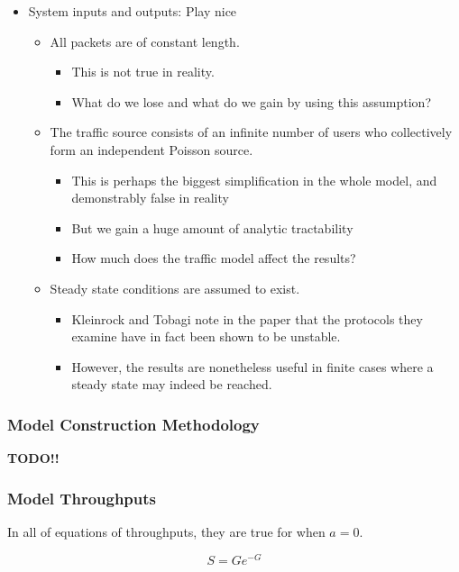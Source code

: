 \begin{itemize}[noitemsep]
\item System inputs and outputs: Play nice
  \begin{itemize}[noitemsep]
  \item All packets are of constant length.
    \begin{itemize}[noitemsep]
    \item This is not true in reality.
    \item What do we lose and what do we gain by using this assumption?
    \end{itemize}
  \item The traffic source consists of an infinite number of users who collectively form an independent Poisson source.
    \begin{itemize}[noitemsep]
    \item This is perhaps the biggest simplification in the whole model, and demonstrably false in reality
    \item But we gain a huge amount of analytic tractability
    \item How much does the traffic model affect the results?
    \end{itemize}

  \item Steady state conditions are assumed to exist.
    \begin{itemize}[noitemsep]
    \item Kleinrock and Tobagi note in the paper that the protocols they examine have in fact been shown to be unstable.
    \item However, the results are nonetheless useful in finite cases where a steady state may indeed be reached.
    \end{itemize}
  \end{itemize}
\end{itemize}

\subsubsection{Model Construction Methodology}\label{subsubsec:Kleinrock_Tobagi_Model_Method}
\textbf{TODO!!}

\subsubsection{Model Throughputs}\label{subsubsec:Kleinrock_Tobagi_Model_Throughputs}
In all of equations of throughputs, they are true for when $a = 0$.

\begin{equation}\label{eq:ALOHA_Throughput}
  S = Ge^{-G}
\end{equation}

